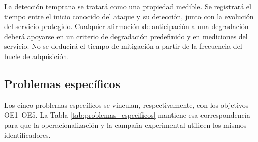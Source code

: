 La detección temprana se tratará como una propiedad medible. Se registrará el tiempo entre el inicio conocido del ataque y su detección, junto con la evolución del servicio protegido. Cualquier afirmación de anticipación a una degradación deberá apoyarse en un criterio de degradación predefinido y en mediciones del servicio. No se deducirá el tiempo de mitigación a partir de la frecuencia del bucle de adquisición.

\subsection{Problemas específicos}

Los cinco problemas específicos se vinculan, respectivamente, con los objetivos OE1--OE5. La Tabla \ref{tab:problemas_especificos} mantiene esa correspondencia para que la operacionalización y la campaña experimental utilicen los mismos identificadores.

